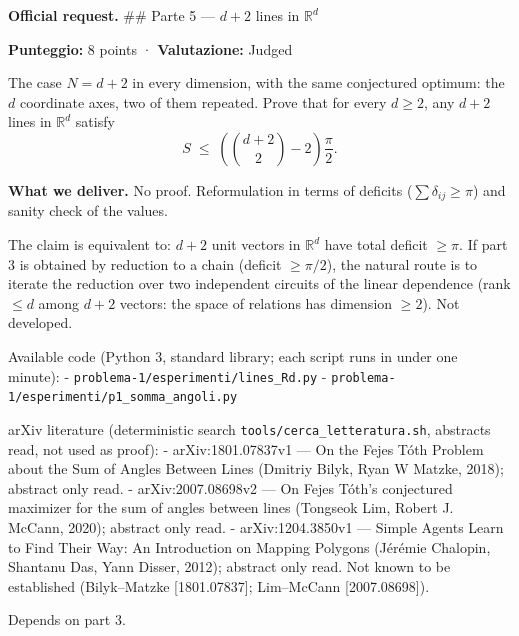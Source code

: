 
\textbf{Official request.} \#\# Parte 5 --- \(d+2\) lines in
\(\mathbb{R}^d\)

\textbf{Punteggio:} 8 points · \textbf{Valutazione:} Judged

The case \(N = d+2\) in every dimension, with the same conjectured
optimum: the \(d\) coordinate axes, two of them repeated. Prove that for
every \(d \ge 2\), any \(d+2\) lines in \(\mathbb{R}^d\) satisfy \[
S \;\le\; \left( \binom{d+2}{2} - 2 \right) \frac{\pi}{2}.
\]

\textbf{What we deliver.} No proof. Reformulation in terms of deficits
(\(\sum\delta_{ij}\ge\pi\)) and sanity check of the values.


The claim is equivalent to: \(d+2\) unit vectors in \(\mathbb R^d\) have
total deficit \(\ge\pi\). If part 3 is obtained by reduction to a chain
(deficit \(\ge\pi/2\)), the natural route is to iterate the reduction
over two independent circuits of the linear dependence (rank \(\le d\)
among \(d+2\) vectors: the space of relations has dimension \(\ge2\)).
Not developed.


Available code (Python 3, standard library; each script runs in under
one minute): - \texttt{problema-1/esperimenti/lines\_Rd.py} -
\texttt{problema-1/esperimenti/p1\_somma\_angoli.py}


arXiv literature (deterministic search
\texttt{tools/cerca\_letteratura.sh}, abstracts read, not used as
proof): - arXiv:1801.07837v1 --- On the Fejes Tóth Problem about the Sum
of Angles Between Lines (Dmitriy Bilyk, Ryan W Matzke, 2018); abstract
only read. - arXiv:2007.08698v2 --- On Fejes Tóth's conjectured
maximizer for the sum of angles between lines (Tongseok Lim, Robert J.
McCann, 2020); abstract only read. - arXiv:1204.3850v1 --- Simple Agents
Learn to Find Their Way: An Introduction on Mapping Polygons (Jérémie
Chalopin, Shantanu Das, Yann Disser, 2012); abstract only read. Not
known to be established (Bilyk--Matzke {[}1801.07837{]}; Lim--McCann
{[}2007.08698{]}).


Depends on part 3.

